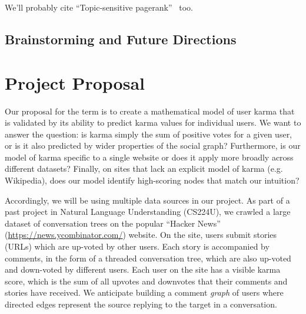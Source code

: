 \documentclass[11pt]{article}
\newcommand{\titlecite}[2]{``#1''~\cite{#2}}
\begin{document}
We'll probably cite \titlecite{Topic-sensitive pagerank}{haveliwala2002topic} too. 

\subsection{Brainstorming and Future Directions}


\section{Project Proposal}
Our proposal for the term is to create a mathematical model of user karma that is
validated by its ability to predict karma values for individual users. We want to answer the 
question: is karma simply the sum of positive votes for a given user, or is it also 
predicted by wider properties of the social graph? Furthermore, is our model of karma
specific to a single website or does it apply more broadly across different datasets?
Finally, on sites that lack an explicit model of karma (e.g. Wikipedia), does our model
identify high-scoring nodes that match our intuition?

Accordingly, we will be using multiple data sources in our project. As part of a past project
in Natural Language Understanding (CS224U), we crawled a large dataset of conversation
trees on the popular ``Hacker News'' (\url{https://news.ycombinator.com/}) website. On the site,
users submit stories (URLs) which are up-voted by other users. Each story is accompanied
by comments, in the form of a threaded conversation tree, which are also up-voted 
and down-voted by different users. Each user on the site has a visible karma score, 
which is the sum of all upvotes and downvotes that their comments and stories have received.
We anticipate building a comment \textit{graph} of users where directed edges represent
the source replying to the target in a conversation.




{} 
\end{document}
